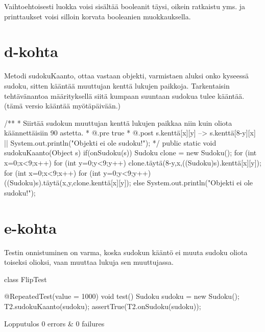 Vaihtoehtoisesti luokka voisi sisältää booleanit täysi, oikein ratkaistu yms. ja printtaukset voisi silloin
korvata booleanien muokkauksella.

\section{d-kohta}
\label{d-kohta}

Metodi sudokuKaanto, ottaa vastaan objekti, varmistaen aluksi onko kyseessä sudoku, sitten kääntää muuttujan kenttä
lukujen paikkoja. Tarkentaisin tehtävänantoa määrityksellä siitä kumpaan suuntaan sudokua tulee kääntää.
(tämä versio kääntää myötäpäivään.)
\begin{javacode}
  /**
   * Siirtää sudokun muuttujan kenttä lukujen paikkaa niin kuin
     oliota käännettäisiin 90 astetta.
   * @.pre true
   * @.post s.kenttä[x][y] --> s.kenttä[8-y][x] ||
     System.out.println("Objekti ei ole sudoku!");
   */
  public static void sudokuKaanto(Object s){
    if(onSudoku(s)) {
      Sudoku clone = new Sudoku();
      for (int x=0;x<9;x++) {
        for (int y=0;y<9;y++) {
          clone.täytä(8-y,x,((Sudoku)s).kenttä[x][y]);
        }
      }
      for (int x=0;x<9;x++) {
        for (int y=0;y<9;y++) {
          ((Sudoku)s).täytä(x,y,clone.kenttä[x][y]);
        }
      }
    }else {
      System.out.println("Objekti ei ole sudoku!");
    }
  }
\end{javacode}

\section{e-kohta}
\label{e-kohta}

Testin onnistuminen on varma, koska sudokun kääntö ei muuta sudoku oliota toiseksi olioksi, vaan muuttaa lukuja sen
muuttujassa.

\begin{javacode}
class FlipTest {

  @RepeatedTest(value = 1000)
  void test() {
    Sudoku sudoku = new Sudoku();
    T2.sudokuKaanto(sudoku);
    assertTrue(T2.onSudoku(sudoku));
  }

}
\end{javacode}
Lopputulos 0 errors & 0 failures
